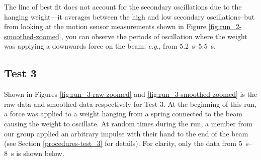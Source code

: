 \documentclass[12 pt]{report}
\newcommand{\eg}{\textit{e}.\textit{g}., }
\begin{document}
The line of best fit does not account for the secondary oscillations due to the hanging weight---it averages between the high and low secondary oscillations--but from looking at the motion sensor measurements shown in Figure \ref{fig:run_2-smoothed-zoomed}, you can observe the periods of oscillation where the weight was applying a downwards force on the beam, \eg from \qtyrange{5.2}{5.5}{\s}.

\subsection{Test 3} \label{data-test_3}
Shown in Figures \ref{fig:run_3-raw-zoomed} and \ref{fig:run_3-smoothed-zoomed} is the raw data and smoothed data respectively for Test 3. At the beginning of this run, a force was applied to a weight hanging from a spring connected to the beam causing the weight to oscillate. At random times during the run, a member from our group applied an arbitrary impulse with their hand to the end of the beam (see Section \ref{procedures-test_3} for details). For clarity, only the data from \qtyrange{5}{8}{\s} is shown below.
\end{document}
